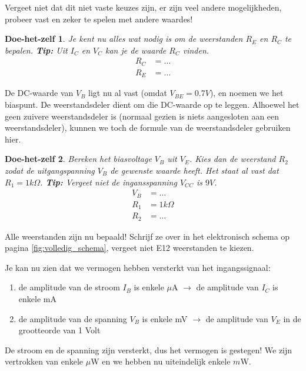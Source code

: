 \documentclass{article}
\newtheorem{DIY}{Doe-het-zelf}
\begin{document}
				Vergeet niet dat dit niet vaste keuzes zijn, er zijn veel andere mogelijkheden, probeer vast en zeker te spelen met andere waardes!

				\begin{DIY} Je kent nu alles wat nodig is om de weerstanden $R_{E}$ en $ R_{C}$ te bepalen. \textbf{Tip:} Uit $I_C$ en $V_C$ kan je de waarde $R_C$ vinden.
				\begin{align}
				    R_C &= \ldots \\
				    R_E &= \ldots
				\end{align}
				\end{DIY}				

				De DC-waarde van $V_B$ ligt nu al vast (omdat $V_{BE} = 0.7V$), en noemen we het biaspunt. De weerstandsdeler dient om die DC-waarde op te leggen. Alhoewel het geen zuivere weerstandsdeler is (normaal gezien is niets aangesloten aan een weerstandsdeler), kunnen we toch de formule van de weerstandsdeler gebruiken hier.

				\begin{DIY} Bereken het biasvoltage $V_B$ uit $V_E$. Kies dan de weerstand $R_2$ zodat de uitgangspanning $V_B$ de gewenste waarde heeft. Het staat al vast dat $R_1 = 1k\Omega$. \textbf{Tip:} Vergeet niet de ingansspanning $V_{CC}$ is $9V$.
				\begin{align}
					V_B &= \ldots \\
				    R_1 &= 1k\Omega \\
				    R_2 &= \ldots
				\end{align}
				\end{DIY}

				Alle weerstanden zijn nu bepaald! Schrijf ze over in het elektronisch schema op pagina \ref{fig:volledig_schema}, vergeet niet E12 weerstanden te kiezen.

				Je kan nu zien dat we vermogen hebben versterkt van het ingangssignaal:
				\begin{enumerate}
				 	\item de amplitude van de stroom $I_B$ is enkele $\mu$A $\rightarrow$ de amplitude van $I_C$ is enkele mA
				 	\item de amplitude van de spanning $V_B$ is enkele mV $\rightarrow$ de amplitude van $V_E$ in de grootteorde van 1 Volt
				 \end{enumerate} 

				 De stroom en de spanning zijn  versterkt, dus het vermogen is gestegen! We zijn vertrokken van enkele $\mu$W en we hebben nu uiteindelijk enkele $m$W. 
\end{document}
